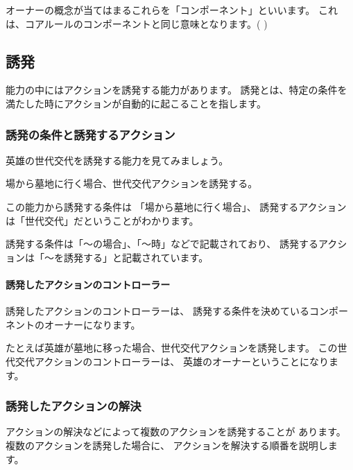 \documentclass[letterpaper,10pt,dvipdfmx]{sphinxmanual}
\begin{document}
オーナーの概念が当てはまるこれらを「コンポーネント」といいます。
これは、コアルールのコンポーネントと同じ意味となります。( {\hyperref[\detokenize{core/core:component}]{}} )


\subsection{誘発}
\label{\detokenize{common/05-action_detail:id5}}
能力の中にはアクションを誘発する能力があります。
誘発とは、特定の条件を満たした時にアクションが自動的に起こることを指します。


\subsubsection{誘発の条件と誘発するアクション}
\label{\detokenize{common/05-action_detail:id6}}
英雄の世代交代を誘発する能力を見てみましょう。

\begin{sphinxVerbatim}[commandchars=\\\{\}]
場から墓地に行く場合、世代交代アクションを誘発する。
\end{sphinxVerbatim}

この能力から誘発する条件は
「場から墓地に行く場合」、
誘発するアクションは「世代交代」だということがわかります。

誘発する条件は「〜の場合」、「〜時」などで記載されており、
誘発するアクションは「〜を誘発する」と記載されています。


\paragraph{誘発したアクションのコントローラー}
\label{\detokenize{common/05-action_detail:id7}}
誘発したアクションのコントローラーは、
誘発する条件を決めているコンポーネントのオーナーになります。

たとえば英雄が墓地に移った場合、世代交代アクションを誘発します。
この世代交代アクションのコントローラーは、
英雄のオーナーということになります。


\subsubsection{誘発したアクションの解決}
\label{\detokenize{common/05-action_detail:id8}}
アクションの解決などによって複数のアクションを誘発することが
あります。
複数のアクションを誘発した場合に、
アクションを解決する順番を説明します。
\end{document}
